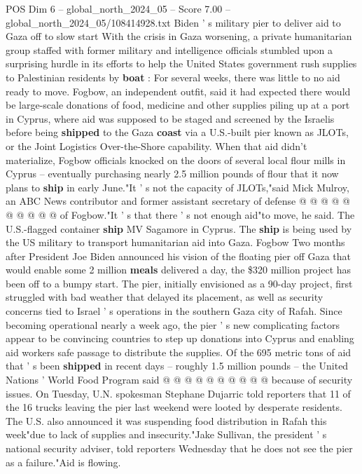 \begin{textsample}{POS Dim 6 – global\_north\_2024\_05 – Score 7.00 – global\_north\_2024\_05/108414928.txt}  \label{ex:f6_pos_164}
Biden ' s military pier to deliver aid to Gaza off to slow start With the crisis in Gaza worsening, a private humanitarian group staffed with former military and intelligence officials stumbled upon a surprising hurdle in its efforts to help the United States government rush supplies to Palestinian residents by \textbf{boat} : For several weeks, there was little to no aid ready to move.
Fogbow, an independent outfit, said it had expected there would be large-scale donations of food, medicine and other supplies piling up at a port in Cyprus, where aid was supposed to be staged and screened by the Israelis before being \textbf{shipped} to the Gaza \textbf{coast} via a U.S.-built pier known as JLOTs, or the Joint Logistics Over-the-Shore capability.
When that aid didn't materialize, Fogbow officials knocked on the doors of several local flour mills in Cyprus -- eventually purchasing nearly 2.5 million pounds of flour that it now plans to \textbf{ship} in early June."It ' s not the capacity of JLOTs,"said Mick Mulroy, an ABC News contributor and former assistant secretary of defense @ @ @ @ @ @ @ @ @ @ of Fogbow."It ' s that there ' s not enough aid"to move, he said.
The U.S.-flagged container \textbf{ship} MV Sagamore in Cyprus.
The \textbf{ship} is being used by the US military to transport humanitarian aid into Gaza.
Fogbow Two months after President Joe Biden announced his vision of the floating pier off Gaza that would enable some 2 million \textbf{meals} delivered a day, the \$320 million project has been off to a bumpy start.
The pier, initially envisioned as a 90-day project, first struggled with bad weather that delayed its placement, as well as security concerns tied to Israel ' s operations in the southern Gaza city of Rafah.
Since becoming operational nearly a week ago, the pier ' s new complicating factors appear to be convincing countries to step up donations into Cyprus and enabling aid workers safe passage to distribute the supplies.
Of the 695 metric tons of aid that ' s been \textbf{shipped} in recent days -- roughly 1.5 million pounds -- the United Nations ' World Food Program said @ @ @ @ @ @ @ @ @ @ because of security issues.
On Tuesday, U.N. spokesman Stephane Dujarric told reporters that 11 of the 16 trucks leaving the pier last weekend were looted by desperate residents.
The U.S. also announced it was suspending food distribution in Rafah this week"due to lack of supplies and insecurity."Jake Sullivan, the president ' s national security adviser, told reporters Wednesday that he does not see the pier as a failure."Aid is flowing.

\end{textsample}
